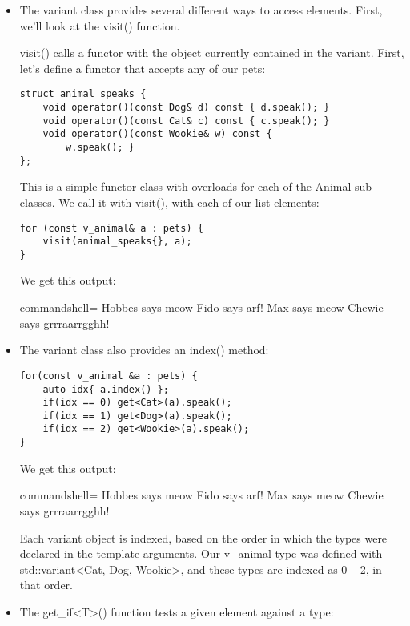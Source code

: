 \begin{itemize}
\item 
The variant class provides several different ways to access elements. First, we'll look at the visit() function.

visit() calls a functor with the object currently contained in the variant. First, let's define a functor that accepts any of our pets:

\begin{lstlisting}[style=styleCXX]
struct animal_speaks {
	void operator()(const Dog& d) const { d.speak(); }
	void operator()(const Cat& c) const { c.speak(); }
	void operator()(const Wookie& w) const {
		w.speak(); }
};
\end{lstlisting}

This is a simple functor class with overloads for each of the Animal sub-classes. We call it with visit(), with each of our list elements:

\begin{lstlisting}[style=styleCXX]
for (const v_animal& a : pets) {
	visit(animal_speaks{}, a);
}
\end{lstlisting}

We get this output:

\begin{tcblisting}{commandshell={}}
Hobbes says meow
Fido says arf!
Max says meow
Chewie says grrraarrgghh!
\end{tcblisting}

\item 
The variant class also provides an index() method:

\begin{lstlisting}[style=styleCXX]
for(const v_animal &a : pets) {
	auto idx{ a.index() };
	if(idx == 0) get<Cat>(a).speak();
	if(idx == 1) get<Dog>(a).speak();
	if(idx == 2) get<Wookie>(a).speak();
}
\end{lstlisting}

We get this output:

\begin{tcblisting}{commandshell={}}
Hobbes says meow
Fido says arf!
Max says meow
Chewie says grrraarrgghh!
\end{tcblisting}

Each variant object is indexed, based on the order in which the types were declared in the template arguments. Our v\_animal type was defined with std::variant<Cat, Dog, Wookie>, and these types are indexed as 0 – 2, in that order.

\item 
The get\_if<T>() function tests a given element against a type:


\end{itemize}
